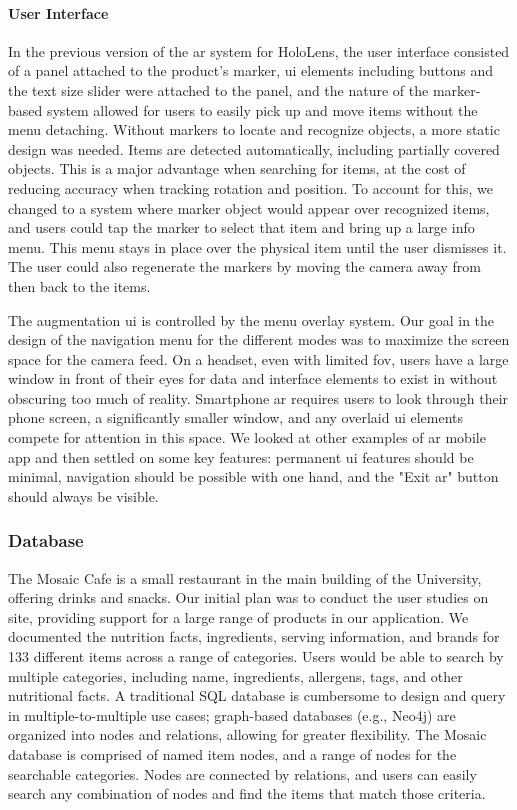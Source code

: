 \documentclass[thesis]{fputhesis}
\begin{document}
\begin{body}
\paragraph{User Interface}
In the previous version of the \acrshort{ar} system for HoloLens, the user interface consisted of a panel attached to the product's marker, \acrshort{ui} elements including buttons and the text size slider were attached to the panel, and the nature of the marker-based system allowed for users to easily pick up and move items without the menu detaching. Without markers to locate and recognize objects, a more static design was needed. Items are detected automatically, including partially covered objects. This is a major advantage when searching for items, at the cost of reducing accuracy when tracking rotation and position. To account for this, we changed to a system where marker object would appear over recognized items, and users could tap the marker to select that item and bring up a large info menu. This menu stays in place over the physical item until the user dismisses it. The user could also regenerate the markers by moving the camera away from then back to the items. 

The augmentation \acrshort{ui} is controlled by the menu overlay system. Our goal in the design of the navigation menu for the different modes was to maximize the screen space for the camera feed. On a headset, even with limited \acrshort{fov}, users have a large window in front of their eyes for data and interface elements to exist in without obscuring too much of reality. Smartphone \acrshort{ar} requires users to look through their phone screen, a significantly smaller window, and any overlaid \acrshort{ui} elements compete for attention in this space. We looked at other examples of \acrshort{ar} mobile app  and then settled on some key features: permanent \acrshort{ui} features should be minimal, navigation should be possible with one hand, and the "Exit \acrshort{ar}" button should always be visible. 

\subsubsection{Database}
The Mosaic Cafe is a small restaurant in the main building of the University, offering drinks and snacks. Our initial plan was to conduct the user studies on site, providing support for a large range of products in our application. We documented the nutrition facts, ingredients, serving information, and brands for 133 different items across a range of categories. Users would be able to search by multiple categories, including name, ingredients, allergens, tags, and other nutritional facts. A traditional SQL database is cumbersome to design and query in multiple-to-multiple use cases; graph-based databases (e.g., Neo4j) are organized into nodes and relations, allowing for greater flexibility. The Mosaic database is comprised of named item nodes, and a range of nodes for the searchable categories. Nodes are connected by relations, and users can easily search any combination of nodes and find the items that match those criteria.


\end{body}
\end{document}
